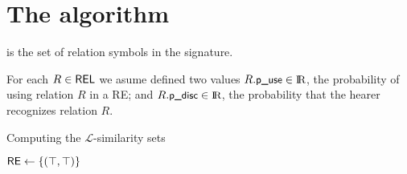 \section{The algorithm}\label{sec:algorithm}



\REL is the set of relation symbols in the signature. 

For each $R \in \textsf{REL}$ we asume defined two values $R.\small \textsf{p\_use} \in \textrm{I}\!\textrm{R}$, the 
probability of using relation $R$ in a RE; and $R.\small \textsf{p\_disc} \in \textrm{I}\!\textrm{R}$, the 
probability that the hearer recognizes relation $R$. 

\begin{algorithm}[h]
\dontprintsemicolon
\caption{Computing the $\mathcal{L}$-similarity sets}
\label{algo:bisim-l}

$\textsf{RE} \leftarrow \{(\top,\top)\}$

\end{algorithm}







